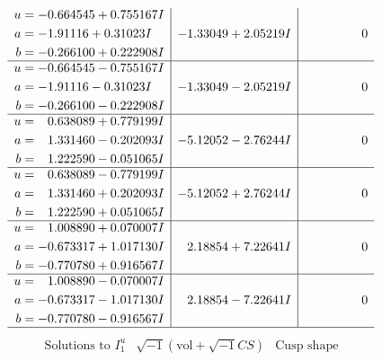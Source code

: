 \documentclass[1p]{elsarticle_modified}
\theoremstyle{definition}
\newcommand{\I}{\sqrt{-1}}
\begin{document}
$$\begin{array}{c|c|c}
\begin{aligned}
u &= -0.664545 + 0.755167 I \\
a &= -1.91116 + 0.31023 I \\
b &= -0.266100 + 0.222908 I\end{aligned}
 & -1.33049 + 2.05219 I & \phantom{-0.000000 } 0 \\ \hline\begin{aligned}
u &= -0.664545 - 0.755167 I \\
a &= -1.91116 - 0.31023 I \\
b &= -0.266100 - 0.222908 I\end{aligned}
 & -1.33049 - 2.05219 I & \phantom{-0.000000 } 0 \\ \hline\begin{aligned}
u &= \phantom{-}0.638089 + 0.779199 I \\
a &= \phantom{-}1.331460 - 0.202093 I \\
b &= \phantom{-}1.222590 - 0.051065 I\end{aligned}
 & -5.12052 - 2.76244 I & \phantom{-0.000000 } 0 \\ \hline\begin{aligned}
u &= \phantom{-}0.638089 - 0.779199 I \\
a &= \phantom{-}1.331460 + 0.202093 I \\
b &= \phantom{-}1.222590 + 0.051065 I\end{aligned}
 & -5.12052 + 2.76244 I & \phantom{-0.000000 } 0 \\ \hline\begin{aligned}
u &= \phantom{-}1.008890 + 0.070007 I \\
a &= -0.673317 + 1.017130 I \\
b &= -0.770780 + 0.916567 I\end{aligned}
 & \phantom{-}2.18854 + 7.22641 I & \phantom{-0.000000 } 0 \\ \hline\begin{aligned}
u &= \phantom{-}1.008890 - 0.070007 I \\
a &= -0.673317 - 1.017130 I \\
b &= -0.770780 - 0.916567 I\end{aligned}
 & \phantom{-}2.18854 - 7.22641 I & \phantom{-0.000000 } 0\\
 \hline 
 \end{array}$$\newpage$$\begin{array}{c|c|c}  
\text{Solutions to }I^u_{1}& \I (\text{vol} + \sqrt{-1}CS) & \text{Cusp shape}\\
 \hline 
\begin{aligned}

\end{aligned}
\end{array}$$
\end{document}
